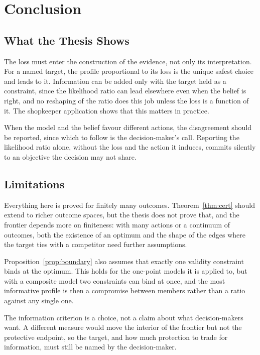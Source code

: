 \section{Conclusion}\label{sec:discussion}

\subsection{What the Thesis Shows}\label{sec:disc_answer}

The loss must enter the construction of the evidence, not only its
interpretation. For a named target, the profile proportional to its loss is
the unique safest choice and leads to it. Information can be added only with
the target held as a constraint, since the likelihood ratio can lead
elsewhere even when the belief is right, and no reshaping of the ratio does
this job unless the loss is a function of it. The shopkeeper application
shows that this matters in practice.

When the model and the belief favour different actions, the disagreement
should be reported, since which to follow is the decision-maker's call.
Reporting the likelihood ratio alone, without the loss and the action it
induces, commits silently to an objective the decision may not share.

\subsection{Limitations}\label{sec:disc_limits}

Everything here is proved for finitely many outcomes. Theorem~\ref{thm:cert}
should extend to richer outcome spaces, but the thesis does not prove that,
and the frontier depends more on finiteness: with many actions or a continuum
of outcomes, both the existence of an optimum and the shape of the edges where
the target ties with a competitor need further assumptions.

Proposition~\ref{prop:boundary} also assumes that exactly one validity
constraint binds at the optimum. This holds for the one-point models it is
applied to, but with a composite model two constraints can bind at once, and
the most informative profile is then a compromise between members rather than
a ratio against any single one.

The information criterion is a choice, not a claim about what decision-makers
want. A different measure would move the interior of the frontier but not the
protective endpoint, so the target, and how much protection to trade for
information, must still be named by the decision-maker.


